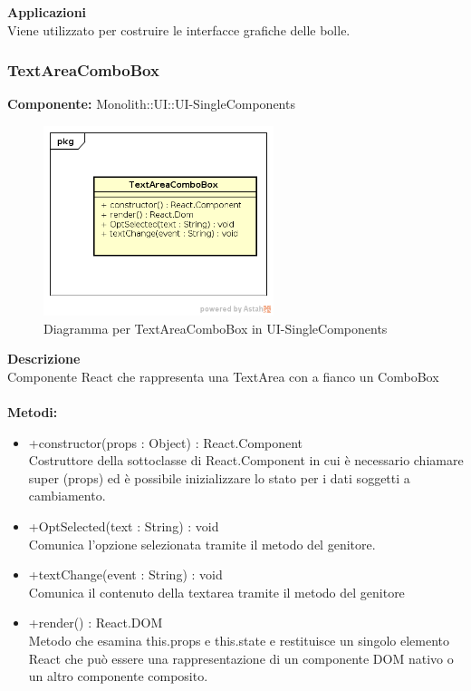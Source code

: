 \textbf{Applicazioni}\\
Viene utilizzato per costruire le interfacce grafiche delle bolle. 


\clearpage

\subsubsection{TextAreaComboBox}
\textbf{Componente:}  Monolith::UI::UI-SingleComponents\\
   \FloatBarrier
   \begin{figure}[ht]
   \centering
   \includegraphics[width=0.6\textwidth]{img/single-TextAreaComboBox}
   \caption{{Diagramma per TextAreaComboBox in UI-SingleComponents}}
\end{figure}
\FloatBarrier
\textbf{Descrizione}\\
Componente React che rappresenta una TextArea con a fianco un ComboBox \\\\
\textbf{Metodi:} \begin{itemize}\item +constructor(props : Object) : React.Component \\Costruttore della sottoclasse di React.Component in cui è necessario chiamare super (props) ed è possibile inizializzare lo stato per i dati soggetti a cambiamento.\item +OptSelected(text : String) : void \\ Comunica l'opzione selezionata tramite il metodo del genitore.\item +textChange(event : String) : void  \\ Comunica il contenuto della textarea tramite il metodo del genitore \item +render() : React.DOM \\Metodo che esamina this.props e this.state e restituisce un singolo elemento React che può essere una rappresentazione di un componente DOM nativo o un altro componente composito.\end{itemize} 


